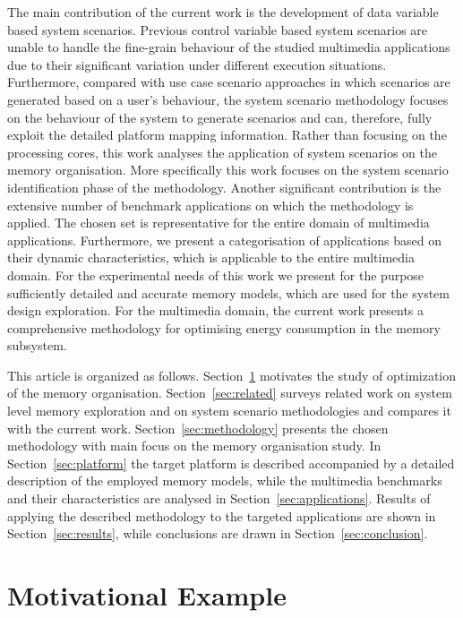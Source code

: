 \documentclass[smallextended]{svjour3}
\begin{document}
The main contribution of the current work is the development of data variable \cite{Elena2012} based system scenarios.
Previous control variable based system scenarios \cite{Gheorghita2007} are unable to handle the fine-grain behaviour of the studied multimedia applications due to their significant variation under different execution situations. 
Furthermore, compared with use case scenario approaches in which scenarios are generated based on a user's behaviour, the system scenario methodology focuses on the behaviour of the system to generate scenarios and can, therefore, fully exploit the detailed platform mapping information. 
Rather than focusing on the processing cores, this work analyses the application of system scenarios on the memory organisation. 
More specifically this work focuses on the system scenario identification phase of the methodology.
Another significant contribution is the extensive number of benchmark applications on which the methodology is applied.
The chosen set is representative for the entire domain of multimedia applications.
Furthermore, we present a categorisation of applications based on their dynamic characteristics, which is applicable to the entire multimedia domain. 
For the experimental needs of this work we present for the purpose sufficiently detailed and accurate  memory models, which are used for the system design exploration.
For the multimedia domain, the current work presents a comprehensive methodology for optimising energy consumption in the memory subsystem.

This article is organized as follows. 
Section~\ref{sec:motivation} motivates the study of optimization of the memory organisation. 
Section~\ref{sec:related} surveys related work on system level memory exploration and on system scenario methodologies and compares it with the current work. 
Section~\ref{sec:methodology} presents the chosen methodology with main focus on the memory organisation study. 
In Section~\ref{sec:platform} the target platform is described accompanied by a detailed description of the employed memory models, while the multimedia benchmarks and their characteristics are analysed in Section~\ref{sec:applications}. 
Results of applying the described methodology to the targeted applications are shown in Section~\ref{sec:results}, while conclusions are drawn in Section~\ref{sec:conclusion}. 

\section{Motivational Example}
\label{sec:motivation}
\end{document}
